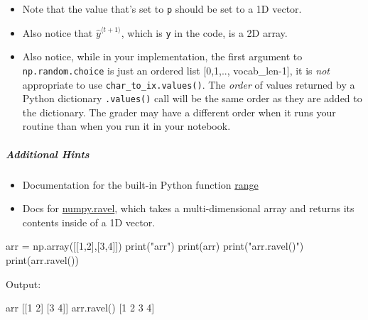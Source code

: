 \documentclass[11pt]{article}
\providecommand{\tightlist}{%
      \setlength{\itemsep}{0pt}\setlength{\parskip}{0pt}}
\newenvironment{Shaded}{}{}
\newcommand{\DecValTok}[1]{\textcolor[rgb]{0.25,0.63,0.44}{{#1}}}
\newcommand{\StringTok}[1]{\textcolor[rgb]{0.25,0.44,0.63}{{#1}}}
\newcommand{\NormalTok}[1]{{#1}}
\newcommand{\OperatorTok}[1]{\textcolor[rgb]{0.40,0.40,0.40}{{#1}}}
\newcommand{\BuiltInTok}[1]{{#1}}
\begin{document}
\begin{itemize}
  \begin{itemize}
  \tightlist
  \item
    Note that the value that's set to \texttt{p} should be set to a 1D
    vector.
  \item
    Also notice that \(\hat{y}^{\langle t+1 \rangle}\), which is
    \texttt{y} in the code, is a 2D array.
  \item
    Also notice, while in your implementation, the first argument to
    \texttt{np.random.choice} is just an ordered list {[}0,1,..,
    vocab\_len-1{]}, it is \emph{not} appropriate to use
    \texttt{char\_to\_ix.values()}. The \emph{order} of values returned
    by a Python dictionary \texttt{.values()} call will be the same
    order as they are added to the dictionary. The grader may have a
    different order when it runs your routine than when you run it in
    your notebook.
  \end{itemize}
\end{itemize}

    \hypertarget{additional-hints}{%
\subparagraph{Additional Hints}\label{additional-hints}}

\begin{itemize}
\tightlist
\item
  Documentation for the built-in Python function
  \href{https://docs.python.org/3/library/functions.html\#func-range}{range}
\item
  Docs for
  \href{https://docs.scipy.org/doc/numpy/reference/generated/numpy.ravel.html}{numpy.ravel},
  which takes a multi-dimensional array and returns its contents inside
  of a 1D vector.
\end{itemize}

\begin{Shaded}
\begin{Highlighting}[]
\NormalTok{arr }\OperatorTok{=}\NormalTok{ np.array([[}\DecValTok{1}\NormalTok{,}\DecValTok{2}\NormalTok{],[}\DecValTok{3}\NormalTok{,}\DecValTok{4}\NormalTok{]])}
\BuiltInTok{print}\NormalTok{(}\StringTok{"arr"}\NormalTok{)}
\BuiltInTok{print}\NormalTok{(arr)}
\BuiltInTok{print}\NormalTok{(}\StringTok{"arr.ravel()"}\NormalTok{)}
\BuiltInTok{print}\NormalTok{(arr.ravel())}
\end{Highlighting}
\end{Shaded}

Output:

\begin{Shaded}
\begin{Highlighting}[]
\NormalTok{arr}
\NormalTok{[[}\DecValTok{1} \DecValTok{2}\NormalTok{]}
\NormalTok{ [}\DecValTok{3} \DecValTok{4}\NormalTok{]]}
\NormalTok{arr.ravel()}
\NormalTok{[}\DecValTok{1} \DecValTok{2} \DecValTok{3} \DecValTok{4}\NormalTok{]}
\end{Highlighting}
\end{Shaded}
\end{document}
